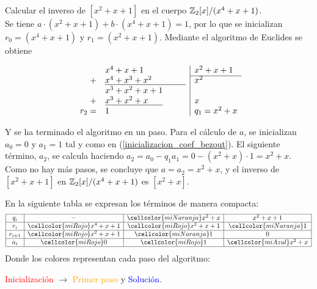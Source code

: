 \begin{ejs}\renewcommand{\arraystretch}{1.2}\label{Ejemplo:inversoEuclides}

    \item Calcular el inverso de $[x^2 + x + 1]$ en el cuerpo $\mathbb{Z}_2[x]/(x^4 + x + 1)$.\\[1ex]
    Se tiene $a\cdot(x^2 + x + 1) + b\cdot (x^4 + x + 1) = 1$, por lo que se inicializan $r_0 = (x^4 + x + 1)$ y $r_1 = (x^2 + x + 1)$. Mediante el algoritmo de Euclides se obtiene
        \begin{center}
            \[
            \begin{array}{rl|l}
                &x^4 + x + 1 & x^2 + x + 1 \\\cline{3-3} 
                +&\underline{x^4 + x^3 + x^2 \phantom{{}+x^2 + 1}} & x^2\\
                &x^3 + x^2 + x + 1 &  \\
                +&\underline{x^3 + x^2 + x\phantom{{ }+ 1}} & x\\
                r_2 =& 1 &  q_1 = x^2 + x 
            \end{array}
            \]
        \end{center}
        Y se ha terminado el algoritmo en un paso. Para el cálculo de $a$, se inicializan $a_0 = 0$ y $a_1 = 1$ tal y como en (\ref{inicializacion_coef_bezout}). El siguiente término, $a_2$, se calcula haciendo $a_2 = a_0 - q_1a_1 = 0 - (x^2 + x)\cdot 1 = x^2 + x$. Como no hay más pasos, se concluye que $a = a_2 = x^2 + x$, y el inverso de $[x^2 + x + 1]$ en $\mathbb{Z}_2[x]/(x^4 + x + 1)$ es $[x^2 + x]$.
        
        En la siguiente tabla se expresan los términos de manera compacta:
        \[
            \begin{array}{|c|c|c|c|}
                \hline
                q_i     &  -          & \cellcolor{miNaranja}x^2 + x     & x^2 + x + 1 \\
                \hline
                r_i    &  \cellcolor{miRojo}x^4 + x + 1 & \cellcolor{miRojo}x^2 + x + 1 & \cellcolor{miNaranja}1  \\
                \hline
                r_{i+1} &  \cellcolor{miRojo}x^2 + x + 1 & \cellcolor{miNaranja}1           &  0        \\
                \hline
                a_i     &\cellcolor{miRojo}0            &  \cellcolor{miRojo}1          &  \cellcolor{miAzul}x^2 + x       \\
                \hline
            \end{array}
        \]
         Donde los colores representan cada paso del algoritmo:%
        \begin{center}
        \vspace{-0.5em}
            \textcolor{red}{Inicialización} $\to$ \textcolor{orange}{Primer paso} y \textcolor{blue}{Solución}.
        \end{center} %
        \vspace{-0.5em}
    

\end{ejs}
